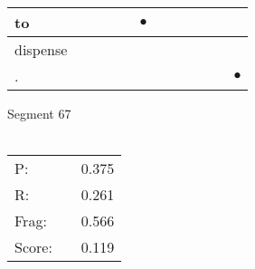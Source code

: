 \documentclass[landscape]{article}
\newcommand{\ssp}{\hspace{2pt}}
\newcommand{\mex}{\cellcolor{g}$\bullet$}
\begin{document}
\begin{tabular}{|l|p{10pt}|p{10pt}|p{10pt}|p{10pt}|p{10pt}|p{10pt}|p{10pt}|p{10pt}|p{10pt}|p{10pt}|p{10pt}|}
\hline
\ssp \cellcolor{ref4}to \ssp&\hspace{2pt}&\hspace{2pt}&\hspace{2pt}&\hspace{2pt}&\hspace{2pt}\mex&\hspace{2pt}&\hspace{2pt}&\hspace{2pt}&\hspace{2pt}&\hspace{2pt}&\hspace{2pt}\\
\hline
\ssp dispense \ssp&\hspace{2pt}&\hspace{2pt}&\hspace{2pt}&\hspace{2pt}&\hspace{2pt}&\hspace{2pt}&\hspace{2pt}&\hspace{2pt}&\hspace{2pt}&\hspace{2pt}&\hspace{2pt}\\
\hline
\ssp \cellcolor{ref10}. \ssp&\hspace{2pt}&\hspace{2pt}&\hspace{2pt}&\hspace{2pt}&\hspace{2pt}&\hspace{2pt}&\hspace{2pt}&\hspace{2pt}&\hspace{2pt}&\hspace{2pt}&\hspace{2pt}\mex\\
\hline
\end{tabular}

\vspace{6pt}
\noindent Segment 67\\\\
\noindent\begin{tabular}{lm{12pt}r}
\hline
P:&&0.375\\
R:&&0.261\\
Frag:&&0.566\\
Score:&&0.119\\
\end{tabular}
\end{document}
